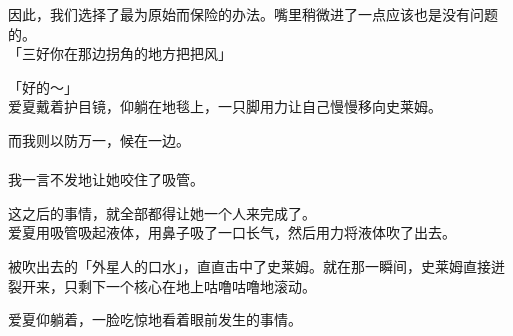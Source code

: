 因此，我们选择了最为原始而保险的办法。嘴里稍微进了一点应该也是没有问题的。\\

「三好你在那边拐角的地方把把风」

「好的～」\\

爱夏戴着护目镜，仰躺在地毯上，一只脚用力让自己慢慢移向史莱姆。

而我则以防万一，候在一边。\\

\\

我一言不发地让她咬住了吸管。

这之后的事情，就全部都得让她一个人来完成了。\\

爱夏用吸管吸起液体，用鼻子吸了一口长气，然后用力将液体吹了出去。

被吹出去的「外星人的口水」，直直击中了史莱姆。就在那一瞬间，史莱姆直接迸裂开来，只剩下一个核心在地上咕噜咕噜地滚动。

爱夏仰躺着，一脸吃惊地看着眼前发生的事情。\\



\\

